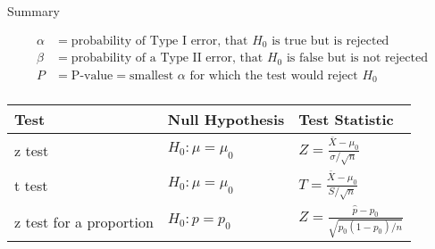 \documentclass[t,handout]{beamer}
\begin{document}
\begin{frame}{Summary}

    \vspace{-.6cm}
    \begin{align*}
        \alpha & = \text{probability of Type I error, that $H_0$ is true but is rejected}          \\
        \beta  & = \text{probability of a Type II error, that $H_0$ is  false but is not rejected} \\
        P      & = \text{P-value} = \text{smallest $\alpha$ for which the test would reject $H_0$} \\
    \end{align*}

    \vspace{-.8cm}
    \begin{center}
        \renewcommand*{\arraystretch}{1.4}
        \begin{tabular}{|p{.9in}|l|l|} \hline
            Test                    & Null Hypothesis  & Test Statistic                                \\ \hline
            z test                  & $H_0: \mu=\mu_0$ & $Z=\frac{\overline X-\mu_0}{\sigma/\sqrt{n}}$ \\ \hline
            t test                  & $H_0: \mu=\mu_0$ & $T=\frac{\overline X-\mu_0}{S /\sqrt{n}}$     \\ \hline
            z test for a proportion & $H_0: p=p_0$     & $Z=\frac{\hat p-p_0}{\sqrt{p_0(1-p_0)/n}}$    \\ \hline
        \end{tabular}
    \end{center}
\end{frame}
\end{document}
